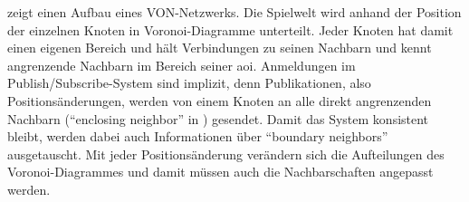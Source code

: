  zeigt einen Aufbau eines VON-Netzwerks. Die Spielwelt wird anhand der Position der einzelnen Knoten in Voronoi-Diagramme unterteilt. Jeder Knoten hat damit einen eigenen Bereich und hält Verbindungen zu seinen Nachbarn und kennt angrenzende Nachbarn im Bereich seiner \ac{aoi}. Anmeldungen im Publish/Subscribe-System sind implizit, denn Publikationen, also Positionsänderungen, werden von einem Knoten an alle direkt angrenzenden Nachbarn (``enclosing neighbor'' in ) gesendet. Damit das System konsistent bleibt, werden dabei auch Informationen über ``boundary neighbors'' ausgetauscht. Mit jeder Positionsänderung verändern sich die Aufteilungen des Voronoi-Diagrammes und damit müssen auch die Nachbarschaften angepasst werden.
